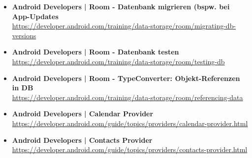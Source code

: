 \documentclass[a4paper]{article}
\begin{document}
\begin{itemize}
			\item \textbf{Android Developers | Room - Datenbank migrieren (bspw. bei App-Updates}\\
			\href{https://developer.android.com/training/data-storage/room/migrating-db-versions}
			{https://developer.android.com/training/data-storage/room/migrating-db-versions}
			
			\item \textbf{Android Developers | Room - Datenbank testen}\\
			\href{https://developer.android.com/training/data-storage/room/testing-db}
			{https://developer.android.com/training/data-storage/room/testing-db}
			
			\item \textbf{Android Developers | Room - TypeConverter: Objekt-Referenzen in DB}\\
			\href{https://developer.android.com/training/data-storage/room/referencing-data}
			{https://developer.android.com/training/data-storage/room/referencing-data}
			
			\item \textbf{Android Developers | Calendar Provider}\\
			\href{https://developer.android.com/guide/topics/providers/calendar-provider.html}
			{https://developer.android.com/guide/topics/providers/calendar-provider.html}
			
			\item \textbf{Android Developers | Contacts Provider}\\
			\href{https://developer.android.com/guide/topics/providers/contacts-provider.html}
			{https://developer.android.com/guide/topics/providers/contacts-provider.html}
									
			
		\end{itemize}
	
	\newpage
	
\end{document}
